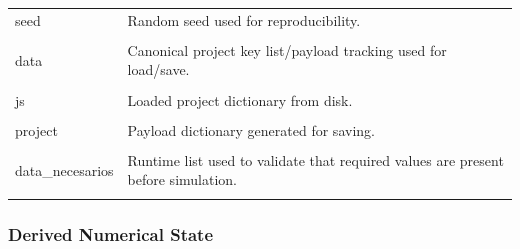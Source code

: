﻿\documentclass[11pt,a4paper]{article}
\begin{document}
\begin{longtable}{|p{}|p{}|}
\hline
seed & Random seed used for reproducibility. \\\\
\hline
data & Canonical project key list/payload tracking used for load/save. \\\\
\hline
js & Loaded project dictionary from disk. \\\\
\hline
project & Payload dictionary generated for saving. \\\\
\hline
data\_necesarios & Runtime list used to validate that required values are present before simulation. \\\\
\hline
\end{longtable}


\subsubsection*{Derived Numerical State}
\end{document}
